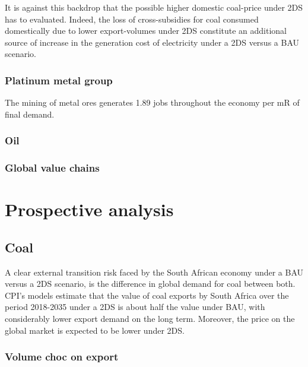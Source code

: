 \documentclass[12pt,english]{article}
\begin{document}

It is against this backdrop that the possible higher domestic coal-price under 2DS has to evaluated. Indeed, the loss of cross-subsidies for coal consumed domestically due to lower export-volumes under 2DS constitute an additional source of increase in the generation cost of electricity under a 2DS versus a BAU scenario.



\subsubsection{Platinum metal group}

The mining of metal ores generates 1.89 jobs throughout the economy per mR of final demand. 

\subsubsection{Oil}

\subsubsection{Global value chains}

\section{Prospective analysis}

\subsection{Coal}

A clear external transition risk faced by the South African economy under a BAU versus a 2DS scenario, is the difference in global demand for coal between both. CPI's models estimate that the value of coal exports by South Africa over the period 2018-2035 under a 2DS is about half the value under BAU, with considerably lower export demand on the long term. Moreover, the price on the global market is expected to be lower under 2DS. 

\subsubsection{Volume choc on export}
\end{document}
